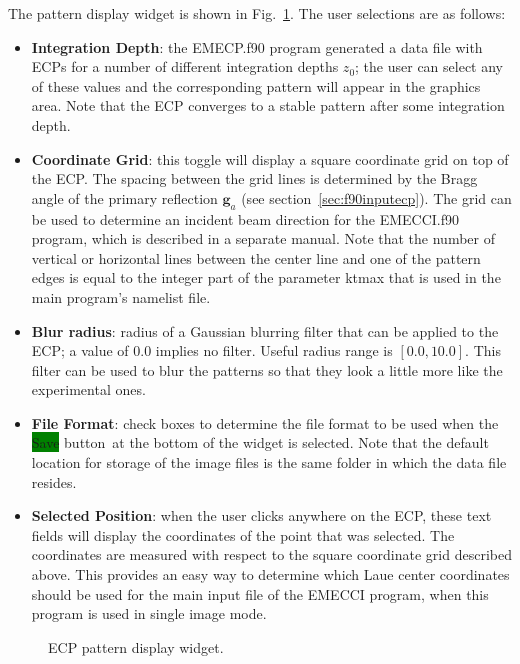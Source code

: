 \documentclass[DIV=calc, paper=letter, fontsize=11pt]{scrartcl}	 %
\newcommand{\button}[1]{\colorbox{green}{\textsf{#1}} button}
\begin{document}
The pattern display widget is shown in Fig.~\ref{fig:widget2}.  The user selections are as follows:
\begin{itemize}
	\item \textbf{Integration Depth}: the \textsf{EMECP.f90} program generated a data file with ECPs for a number of different
	integration depths $z_0$; the user can select any of these values and the corresponding pattern will appear in the graphics area.
	Note that the ECP converges to a stable pattern after some integration depth.
	\item \textbf{Coordinate Grid}: this toggle will display a square coordinate grid on top of the ECP.  The spacing between the 
	grid lines is determined by the Bragg angle of the primary reflection $\mathbf{g}_a$ (see section~\ref{sec:f90inputecp}).  The grid
	can be used to determine an incident beam direction for the \textsf{EMECCI.f90} program, which is described in a separate manual.
	Note that the number of vertical or horizontal lines between the center line and one of the pattern edges is equal to the 
	integer part of the parameter \textsf{ktmax} that is used in the main program's namelist file.
	\item \textbf{Blur radius}: radius of a Gaussian blurring filter that can be applied to the ECP; a value of $0.0$ implies no
	filter.  Useful radius range is $[0.0,10.0]$.  This filter can be used to blur the patterns so that they look a little more 
	like the experimental ones.
	\item \textbf{File Format}: check boxes to determine the file format to be used when the \button{Save}\ at the bottom of the widget
	is selected.  Note that the default location for storage of the image files is the same folder in which the data file resides. 
	\item \textbf{Selected Position}: when the user clicks anywhere on the ECP, these text fields will display the coordinates of the point 
	that was selected.  The coordinates are measured with respect to the square coordinate grid described above.  This provides an easy
	way to determine which Laue center coordinates should be used for the main input file of the \textsf{EMECCI} program, when this
	program is used in single image mode.
\end{itemize}

\begin{figure}[h]
\leavevmode\centering
\epsfxsize=2.75in
\caption{\label{fig:widget2}ECP pattern display widget.}
\end{figure}
\end{document}
